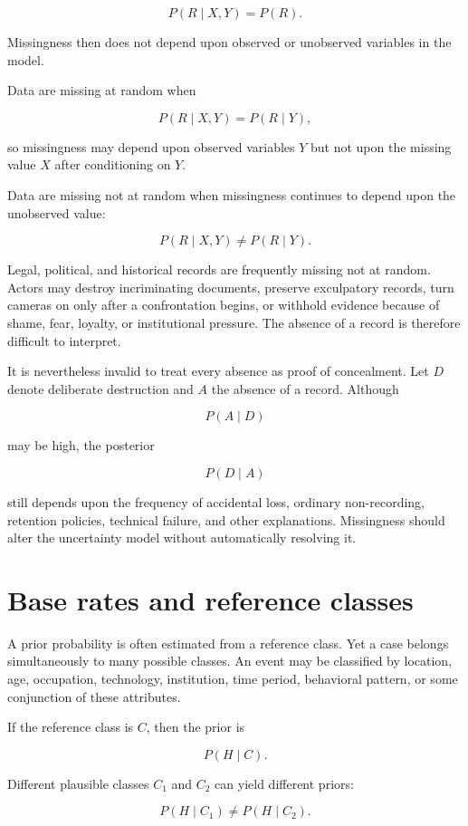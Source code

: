 \[
P(R\mid X,Y)=P(R).
\]

Missingness then does not depend upon observed or unobserved variables in the model.

Data are missing at random when

\[
P(R\mid X,Y)=P(R\mid Y),
\]

so missingness may depend upon observed variables \(Y\) but not upon the missing value \(X\) after conditioning on \(Y\).

Data are missing not at random when missingness continues to depend upon the unobserved value:

\[
P(R\mid X,Y)
\neq
P(R\mid Y).
\]

Legal, political, and historical records are frequently missing not at random. Actors may destroy incriminating documents, preserve exculpatory records, turn cameras on only after a confrontation begins, or withhold evidence because of shame, fear, loyalty, or institutional pressure. The absence of a record is therefore difficult to interpret.

It is nevertheless invalid to treat every absence as proof of concealment. Let \(D\) denote deliberate destruction and \(A\) the absence of a record. Although

\[
P(A\mid D)
\]

may be high, the posterior

\[
P(D\mid A)
\]

still depends upon the frequency of accidental loss, ordinary non-recording, retention policies, technical failure, and other explanations. Missingness should alter the uncertainty model without automatically resolving it.

\section{Base rates and reference classes}
\label{sec:a11}

A prior probability is often estimated from a reference class. Yet a case belongs simultaneously to many possible classes. An event may be classified by location, age, occupation, technology, institution, time period, behavioral pattern, or some conjunction of these attributes.

If the reference class is \(C\), then the prior is

\[
P(H\mid C).
\]

Different plausible classes \(C_1\) and \(C_2\) can yield different priors:

\[
P(H\mid C_1)\neq P(H\mid C_2).
\]

